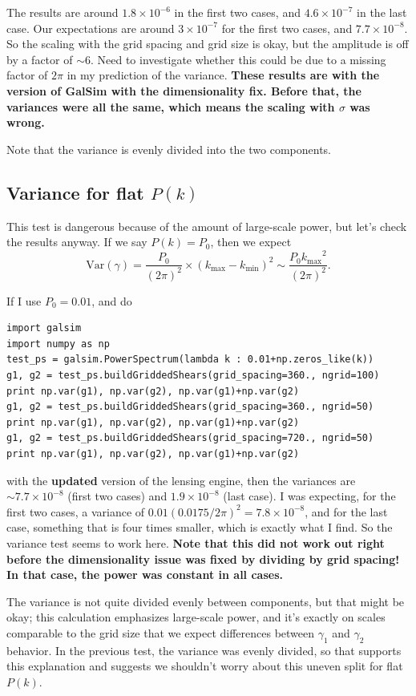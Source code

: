 \documentclass[preprint]{aastex}
\newcommand{\kmax}{\ensuremath{k_\mathrm{max}}}
\newcommand{\kmin}{\ensuremath{k_\mathrm{min}}}
\newcommand{\beq}{\begin{equation}}
\newcommand{\eeq}{\end{equation}}
\begin{document}
The results are around $1.8\times 10^{-6}$ in the first two cases, and
$4.6\times 10^{-7}$ in the last case.  Our expectations are around
$3\times 10^{-7}$ for the first two cases, and $7.7\times 10^{-8}$.
So the scaling with the grid spacing and grid size is okay, but the
amplitude is off by a factor of $\sim 6$. Need to investigate whether
this could be due to a missing factor of $2\pi$ in my prediction of
the variance. \textbf{These results are with the version of GalSim
  with the dimensionality fix.  Before that, the variances were all
  the same, which means the scaling with $\sigma$ was wrong.}

Note that the variance is evenly divided into the two components.

\subsection{Variance for flat $P(k)$}

This test is dangerous because of the amount of large-scale power, but
let's check the results anyway.  If we say $P(k)=P_0$, then we expect
\beq
\mathrm{Var}(\gamma) = \frac{P_0}{(2\pi)^2} \times (\kmax-\kmin)^2
\sim \frac{P_0 \kmax^2}{(2\pi)^2}.
\eeq

If I use $P_0=0.01$, and do 
\begin{verbatim}
import galsim
import numpy as np
test_ps = galsim.PowerSpectrum(lambda k : 0.01+np.zeros_like(k))
g1, g2 = test_ps.buildGriddedShears(grid_spacing=360., ngrid=100)
print np.var(g1), np.var(g2), np.var(g1)+np.var(g2)
g1, g2 = test_ps.buildGriddedShears(grid_spacing=360., ngrid=50)
print np.var(g1), np.var(g2), np.var(g1)+np.var(g2)
g1, g2 = test_ps.buildGriddedShears(grid_spacing=720., ngrid=50)
print np.var(g1), np.var(g2), np.var(g1)+np.var(g2)
\end{verbatim}
with the \textbf{updated} version of the lensing engine, then the variances are $\sim 7.7\times 10^{-8}$ (first two cases) and
$1.9\times 10^{-8}$ (last case).  I was expecting, for the first two
cases, a variance of $0.01 (0.0175/2\pi)^2=7.8\times 10^{-8}$, and for
the last case, something that is four times smaller, which is exactly
what I find.  So the variance test seems to work here.  \textbf{Note
  that this did not work out right before the dimensionality issue was
  fixed by dividing by grid spacing!  In that case, the power was
  constant in all cases.}

The variance is not quite divided evenly between components, but that
might be okay; this calculation emphasizes large-scale power, and it's
exactly on scales comparable to the grid size that we expect
differences between $\gamma_1$ and $\gamma_2$ behavior.  In the
previous test, the variance was evenly divided, so that supports this
explanation and suggests we shouldn't worry about this uneven split
for flat $P(k)$.
\end{document}
